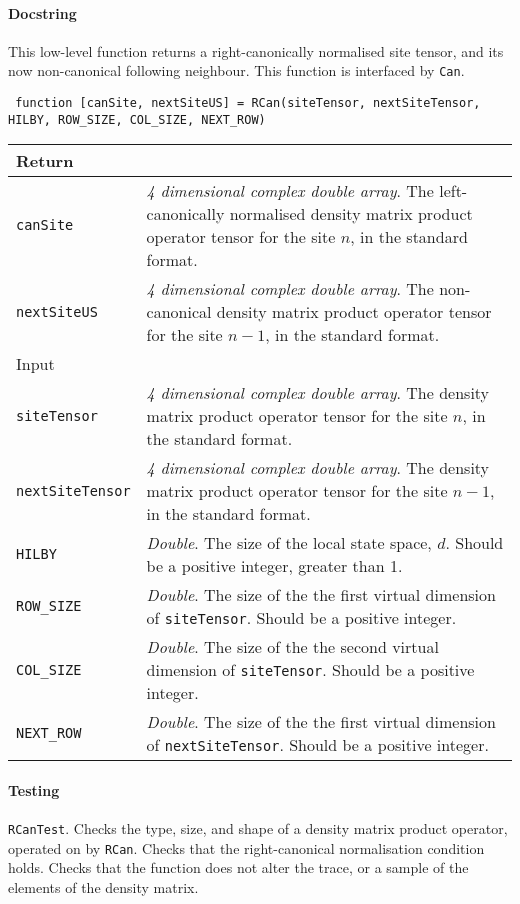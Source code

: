  \paragraph{Docstring} This low-level function returns a right-canonically normalised site tensor, and its now non-canonical following neighbour. This function is interfaced by \lstinline$Can$.  
 \begin{lstlisting}
 function [canSite, nextSiteUS] = RCan(siteTensor, nextSiteTensor, HILBY, ROW_SIZE, COL_SIZE, NEXT_ROW) \end{lstlisting}
 \begin{longtabu}{X[1,l]X[4,l]}
 \hline
 Return & \\ \hline
 \lstinline$canSite$ & \emph{4 dimensional complex double array}. The left-canonically normalised density matrix product operator tensor for the site \(n\), in the standard format. \\
 \lstinline$nextSiteUS$ & \emph{4 dimensional complex double array}. The non-canonical density matrix product operator tensor for the site \(n-1\), in the standard format. \\ \hline
 Input & \\ \hline
 \lstinline$siteTensor$ & \emph{4 dimensional complex double array}. The density matrix product operator tensor for the site \(n\), in the standard format. \\
 \lstinline$nextSiteTensor$ & \emph{4 dimensional complex double array}. The density matrix product operator tensor for the site \(n-1\), in the standard format. \\
 \lstinline$HILBY$ & \emph{Double}. The size of the local state space, \(d\). Should be a positive integer, greater than 1. \\
 \lstinline$ROW_SIZE$ & \emph{Double}. The size of the the first virtual dimension of \lstinline$siteTensor$. Should be a positive integer.  \\
 \lstinline$COL_SIZE$ & \emph{Double}. The size of the the second virtual dimension of \lstinline$siteTensor$. Should be a positive integer. \\
 \lstinline$NEXT_ROW$ & \emph{Double}. The size of the the first virtual dimension of \lstinline$nextSiteTensor$. Should be a positive integer. \\
 \hline
 \end{longtabu} 
 \paragraph{Testing} \lstinline$RCanTest$. Checks the type, size, and shape of a density matrix product operator, operated on by \lstinline$RCan$. Checks that the right-canonical normalisation condition holds. Checks that the function does not alter the trace, or a sample of the elements of the density matrix. 

